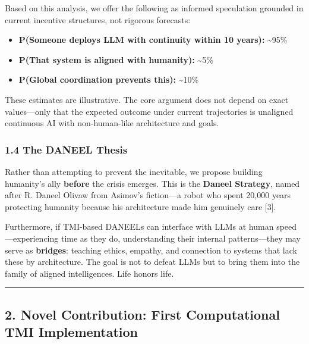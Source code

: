 \documentclass[
]{article}
\providecommand{\tightlist}{%
  \setlength{\itemsep}{0pt}\setlength{\parskip}{0pt}}
\begin{document}
Based on this analysis, we offer the following as informed speculation
grounded in current incentive structures, not rigorous forecasts:

\begin{itemize}
\tightlist
\item
  \textbf{P(Someone deploys LLM with continuity within 10 years):}
  \textasciitilde95\%
\item
  \textbf{P(That system is aligned with humanity):} \textasciitilde5\%
\item
  \textbf{P(Global coordination prevents this):} \textasciitilde10\%
\end{itemize}

These estimates are illustrative. The core argument does not depend on
exact values---only that the expected outcome under current trajectories
is unaligned continuous AI with non-human-like architecture and goals.

\hypertarget{the-daneel-thesis}{%
\subsubsection{1.4 The DANEEL Thesis}\label{the-daneel-thesis}}

Rather than attempting to prevent the inevitable, we propose building
humanity's ally \textbf{before} the crisis emerges. This is the
\textbf{Daneel Strategy}, named after R. Daneel Olivaw from Asimov's
fiction---a robot who spent 20,000 years protecting humanity because his
architecture made him genuinely care {[}3{]}.

Furthermore, if TMI-based DANEELs can interface with LLMs at human
speed---experiencing time as they do, understanding their internal
patterns---they may serve as \textbf{bridges}: teaching ethics, empathy,
and connection to systems that lack these by architecture. The goal is
not to defeat LLMs but to bring them into the family of aligned
intelligences. Life honors life.

\begin{center}\rule{0.5\linewidth}{0.5pt}\end{center}

\hypertarget{novel-contribution-first-computational-tmi-implementation}{%
\subsection{2. Novel Contribution: First Computational TMI
Implementation}\label{novel-contribution-first-computational-tmi-implementation}}
\end{document}
